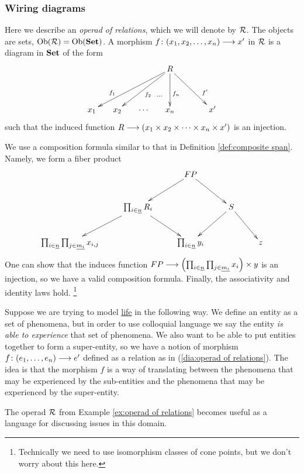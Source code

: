 
\subsubsection{Wiring diagrams}


\begin{example}\label{ex:operad of relations}

Here we describe an {\em operad of relations}, which we will denote by $\mathcal{R}$. The objects are sets, $\textnormal{Ob}(\mathcal{R})=\textnormal{Ob}({\bf Set})$. A morphism $f\colon (x_1,x_2,\ldots,x_n)\longrightarrow x'$ in $\mathcal{R}$ is a diagram in ${\bf Set}$ of the form 
\begin{align}\label{dia:operad of relations}
\xymatrix@=15pt{&&&R\ar[llldd]_(.7){f_1}\ar[lldd]^{f_2}\ar@{}[ldd]^(.6)\cdots\ar[dd]^(.6){f_n}\ar[rrdd]^(.7){f'}\\\\x_1&x_2&\cdots&x_n&&x'}
\end{align} 
such that the induced function $R\longrightarrow(x_1\times x_2\times\cdots\times x_n\times x')$ is an injection.

We use a composition formula similar to that in Definition \ref{def:composite span}. Namely, we form a fiber product
$$\xymatrix{&&FP\ar[rd]\ar[ld]\\&\prod_{i\in\ul{n}}R_i\ar[ld]\ar[rd]&&S\ar[ld]\ar[rd]\\\prod_{i\in\ul{n}}\prod_{j\in\ul{m_i}}x_{i,j}&&\prod_{i\in\ul{n}}y_i&&z}$$
One can show that the induces function $FP\longrightarrow\left(\prod_{i\in\underline{n}}\prod_{j\in\underline{m_i}}x_i\right)\times y$ is an injection, so we have a valid composition formula. Finally, the associativity and identity laws hold.
\footnote{Technically we need to use isomorphism classes of cone points, but we don't worry about this here.}

\end{example}

\begin{application}\label{app:entity by experience}
Suppose we are trying to model \href{http://en.wikipedia.org/wiki/Life}{\text life} in the following way. We define an entity as a set of phenomena, but in order to use colloquial language we say the entity {\em is able to experience} that set of phenomena. We also want to be able to put entities together to form a super-entity, so we have a notion of morphism $f\colon(e_1,\ldots,e_n)\longrightarrow e'$ defined as a relation as in (\ref{dia:operad of relations}). The idea is that the morphism $f$ is a way of translating between the phenomena that may be experienced by the sub-entities and the phenomena that may be experienced by the super-entity. 

The operad $\mathcal{R}$ from Example \ref{ex:operad of relations} becomes useful as a language for discussing issues in this domain.
\end{application}

